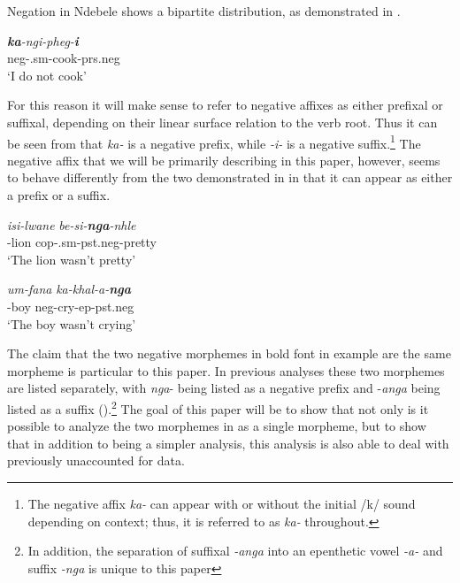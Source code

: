 \documentclass[output=paper]{langsci/langscibook}
\newcommand{\ii}[0]{\textit{-i- }}
\begin{document}
Negation in Ndebele shows a bipartite distribution, as demonstrated in .


\begin{exe}
\ex\label{ex:burkholder:1}
\gll  \textit{\textbf {ka}-ngi-pheg-\textbf{i}}\\
          {\sc neg}-.{\sc sm}-cook-{\sc prs.neg}\\
    \glt `I do not cook'
\end{exe}


For this reason it will make sense to refer to negative affixes as either prefixal or suffixal, depending on their linear surface relation to the verb root. Thus it can be seen from  that \textit{ka-} is a negative prefix, while \ii is a negative suffix.\footnote{The negative affix \textit{ka-} can appear with or without the initial /k/ sound depending on context; thus, it is referred to as \textit{ka-} throughout.} The negative affix that we will be primarily describing in this paper, however, seems to behave differently from the two demonstrated in  in that it can appear as either a prefix or a suffix.

\begin{exe}
\ex\label{ex:burkholder:2}
\begin{xlist}
\ex\label{ex:burkholder:2a} 
\gll \textit{isi-lwane}  \textit{be-si-\textbf{nga}-nhle}\\
       -lion {\sc cop}-.{\sc sm}-{\sc pst.neg}-pretty\\
    \glt `The lion wasn't pretty' 

\ex\label{ex:burkholder:2b}  
\gll \textit{um-fana} \textit{ka-khal-a-\textbf{nga}}\\
         -boy {\sc neg}-cry-{\sc ep}-{\sc pst.neg}\\
    \glt `The boy wasn't crying'
\end{xlist}
\end{exe}

The claim that the two negative morphemes in bold font in example  are the same morpheme is particular to this paper. In previous analyses these two morphemes are listed separately, with \textit{nga}- being listed as a negative prefix and -\textit{anga} being listed as a suffix (\citealt{Sibanda2004,Khumalo1981,Khumalo1982}).\footnote{In addition, the separation of suffixal \textit{-anga} into an epenthetic vowel \textit{-a-} and suffix \textit{-nga} is unique to this paper} The goal of this paper will be to show that not only is it possible to analyze the two morphemes in  as a single morpheme, but to show that in addition to being a simpler analysis, this analysis is also able to deal with previously unaccounted for data.
\end{document}

